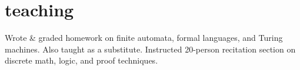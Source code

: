 \documentclass{cv}
\begin{document}
\section{teaching}

\begin{entrylist}
    {Wrote \& graded homework on finite automata, formal languages, and Turing machines. Also taught as a substitute.}
    {Instructed 20-person recitation section on discrete math, logic, and proof techniques.}
\end{entrylist}
\end{document}
